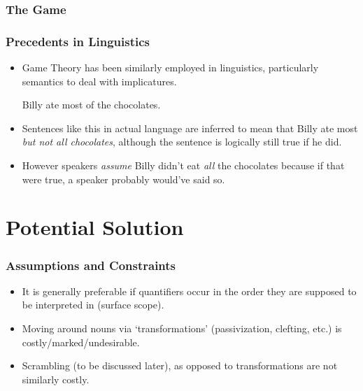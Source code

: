 \documentclass[aspectratio=1610]{beamer}
\begin{document}
\begin{frame}
	\frametitle{The Game}

\begin{figure}
\begin{center}
\end{center}
\end{figure}
\end{frame}




\begin{frame}
\frametitle{Precedents in Linguistics}\pause
\begin{itemize}
\item Game Theory has been similarly employed in linguistics, particularly semantics to deal with implicatures.\pause
\begin{exe}
\ex Billy ate most of the chocolates.
\end{exe}\pause
\item Sentences like this in actual language are inferred to mean that Billy ate most \emph{but not all chocolates}, although the sentence is logically still true if he did.\pause
\item However speakers \emph{assume} Billy didn't eat \emph{all} the chocolates because if that were true, a speaker probably would've said so.
\end{itemize}
\end{frame}


\section{Potential Solution}

\begin{frame}
\frametitle{Assumptions and Constraints}
\begin{itemize}\pause
\item It is generally preferable if quantifiers occur in the order they are supposed to be interpreted in (surface scope).\pause
\item Moving around nouns via `transformations' (passivization, clefting, etc.) is costly/marked/undesirable.\pause
\item Scrambling (to be discussed later), as opposed to transformations are not similarly costly.
\end{itemize}
\end{frame}
\end{document}
